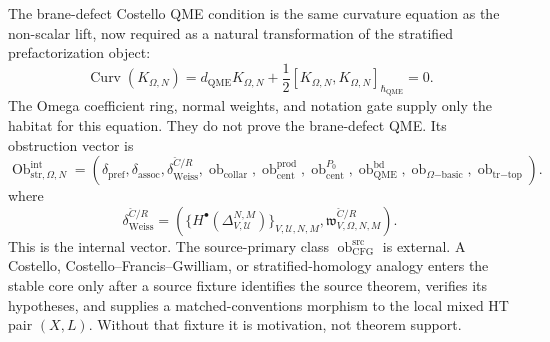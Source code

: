 \begin{enumerate}
  The brane-defect Costello QME condition is the same curvature equation
  as the non-scalar lift, now required as a natural transformation of
  the stratified prefactorization object:
  \[
    \operatorname{Curv}(K_{\Omega,N})
      =
      d_{\mathrm{QME}}K_{\Omega,N}
      +\frac12[K_{\Omega,N},K_{\Omega,N}]_{\hbar_{\mathrm{QME}}}=0.
  \]
  The Omega coefficient ring, normal weights, and notation gate supply
  only the habitat for this equation.  They do not prove the
  brane-defect QME.
  Its obstruction vector is
  \[
    \operatorname{Ob}^{\mathrm{int}}_{\mathrm{str},\Omega,N}
    =
    (\delta_{\mathrm{pref}},
     \delta_{\mathrm{assoc}},
     \delta_{\mathrm{Weiss}}^{\check C/R},
     \operatorname{ob}_{\mathrm{collar}},
     \operatorname{ob}^{\mathrm{prod}}_{\mathrm{cent}},
     \operatorname{ob}^{P_0}_{\mathrm{cent}},
     \operatorname{ob}^{\mathrm{bd}}_{\mathrm{QME}},
     \operatorname{ob}_{\Omega\mathrm{-basic}},
     \operatorname{ob}_{\mathrm{tr}\mathrm{-top}}).
  \]
  where
  \[
    \delta_{\mathrm{Weiss}}^{\check C/R}
    =
    \left(
      \{H^\bullet(\Delta^{N,M}_{V,\mathcal U})\}_{V,\mathcal U,N,M},
      \mathfrak w^{\check C/R}_{V,\Omega,N,M}
    \right).
  \]
  This is the internal vector.  The source-primary class
  \(\operatorname{ob}^{\mathrm{src}}_{\mathrm{CFG}}\) is external.  A
  Costello, Costello--Francis--Gwilliam, or stratified-homology analogy
  enters the stable core only after a source fixture identifies the source
  theorem, verifies its hypotheses, and supplies a matched-conventions
  morphism to the local mixed HT pair \((X,L)\).  Without that fixture it is
  motivation, not theorem support.


\end{enumerate}
